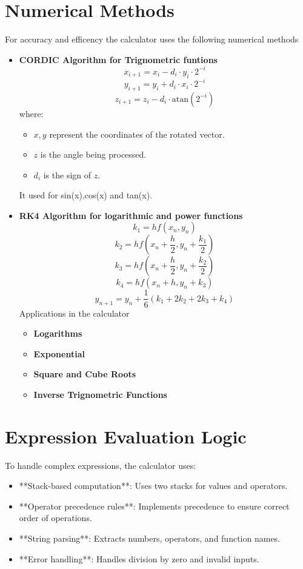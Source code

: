 \documentclass[a4paper,12pt]{article}
\begin{document}
\section{Numerical Methods}
For accuracy and efficency the calculator uses the following numerical methods
\begin{itemize}
    \item \textbf{CORDIC Algorithm for Trignometric funtions}\\
\[
    x_{i+1} = x_i - d_i \cdot y_i \cdot 2^{-i}
    \]
    \[
    y_{i+1} = y_i + d_i \cdot x_i \cdot 2^{-i}
    \]
    \[
    z_{i+1} = z_i - d_i \cdot \text{atan}(2^{-i})
\]
where:
\begin{itemize}
    \item \( x, y \) represent the coordinates of the rotated vector.
    \item \( z \) is the angle being processed.
    \item \( d_i \) is the sign of \( z \).
\end{itemize}
It used for sin(x),cos(x) and tan(x).
\item \textbf{RK4 Algorithm for logarithmic and power functions}\\
\[
k_1 = h f(x_n, y_n)
\]
\[
k_2 = h f(x_n + \frac{h}{2}, y_n + \frac{k_1}{2})
\]
\[
k_3 = h f(x_n + \frac{h}{2}, y_n + \frac{k_2}{2})
\]
\[
k_4 = h f(x_n + h, y_n + k_3)
\]
\[
y_{n+1} = y_n + \frac{1}{6} (k_1 + 2k_2 + 2k_3 + k_4)
\]
Applications in the calculator 
\begin{itemize}
    \item \textbf{Logarithms}
    \item \textbf{Exponential}
    \item \textbf{Square and Cube Roots}
    \item \textbf{Inverse Trignometric Functions}
\end{itemize}
\end{itemize}
\section{Expression Evaluation Logic}
To handle complex expressions, the calculator uses:
\begin{itemize}
    \item **Stack-based computation**: Uses two stacks for values and operators.
    \item **Operator precedence rules**: Implements precedence to ensure correct order of operations.
    \item **String parsing**: Extracts numbers, operators, and function names.
    \item **Error handling**: Handles division by zero and invalid inputs.
\end{itemize}
\end{document}
